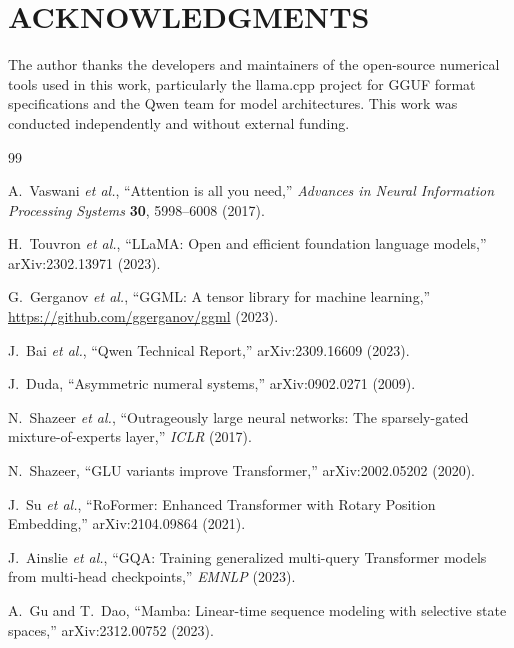 \documentclass[aip,twocolumn,letterpaper]{revtex4}
\begin{document}
\section*{ACKNOWLEDGMENTS}

The author thanks the developers and maintainers of the open-source numerical tools used in this work, particularly the llama.cpp project for GGUF format specifications and the Qwen team for model architectures. This work was conducted independently and without external funding.

\begin{thebibliography}{99}

A.~Vaswani \textit{et al.},
``Attention is all you need,''
\textit{Advances in Neural Information Processing Systems} \textbf{30}, 5998--6008 (2017).

H.~Touvron \textit{et al.},
``LLaMA: Open and efficient foundation language models,''
arXiv:2302.13971 (2023).

G.~Gerganov \textit{et al.},
``GGML: A tensor library for machine learning,''
\url{https://github.com/ggerganov/ggml} (2023).

J.~Bai \textit{et al.},
``Qwen Technical Report,''
arXiv:2309.16609 (2023).

J.~Duda,
``Asymmetric numeral systems,''
arXiv:0902.0271 (2009).

N.~Shazeer \textit{et al.},
``Outrageously large neural networks: The sparsely-gated mixture-of-experts layer,''
\textit{ICLR} (2017).

N.~Shazeer,
``GLU variants improve Transformer,''
arXiv:2002.05202 (2020).

J.~Su \textit{et al.},
``RoFormer: Enhanced Transformer with Rotary Position Embedding,''
arXiv:2104.09864 (2021).

J.~Ainslie \textit{et al.},
``GQA: Training generalized multi-query Transformer models from multi-head checkpoints,''
\textit{EMNLP} (2023).

A.~Gu and T.~Dao,
``Mamba: Linear-time sequence modeling with selective state spaces,''
arXiv:2312.00752 (2023).

\end{thebibliography}
\end{document}
